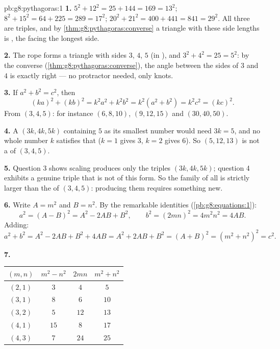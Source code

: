 \begin{solution}{pb:g8:pythagoras:1}
\textbf{1.} $5^2 + 12^2 = 25 + 144 = 169 = 13^2$; \quad
$8^2 + 15^2 = 64 + 225 = 289 = 17^2$; \quad
$20^2 + 21^2 = 400 + 441 = 841 = 29^2$. All three are triples,
and by \cref{thm:g8:pythagoras:converse} a triangle with these
side lengths is , the  facing the longest
side.

\textbf{2.} The rope forms a triangle with sides $3$, $4$, $5$
(in ), and $3^2 + 4^2 = 25 = 5^2$: by the converse
(\cref{thm:g8:pythagoras:converse}), the angle between the sides
of $3$ and $4$  is exactly right --- no protractor
needed, only knots.

\textbf{3.} If $a^2 + b^2 = c^2$, then
\[
(ka)^2 + (kb)^2 = k^2 a^2 + k^2 b^2
= k^2\left(a^2 + b^2\right) = k^2 c^2 = (kc)^2 .
\]
From $(3, 4, 5)$: for instance $(6, 8, 10)$, $(9, 12, 15)$ and
$(30, 40, 50)$.

\textbf{4.} A  $(3k, 4k, 5k)$ containing $5$ as its
smallest number would need $3k = 5$, and no whole number $k$
satisfies that ($k = 1$ gives $3$, $k = 2$ gives $6$). So
$(5, 12, 13)$ is not a  of $(3, 4, 5)$.

\textbf{5.} Question 3 shows scaling produces only the triples
$(3k, 4k, 5k)$; question 4 exhibits a genuine triple that is not
of this form. So the family of all  is
strictly larger than the  of $(3, 4, 5)$: producing them
requires something new.

\textbf{6.} Write $A = m^2$ and $B = n^2$. By the remarkable
identities (\cref{pb:g8:equations:1}):
\[
a^2 = (A - B)^2 = A^2 - 2AB + B^2,
\qquad
b^2 = (2mn)^2 = 4m^2n^2 = 4AB .
\]
Adding:
\[
a^2 + b^2 = A^2 - 2AB + B^2 + 4AB
= A^2 + 2AB + B^2 = (A + B)^2
= \left(m^2 + n^2\right)^2 = c^2 .
\]

\textbf{7.}
\begin{center}
\renewcommand{\arraystretch}{1.2}
\begin{tabular}{c|ccc}
$(m, n)$ & $m^2 - n^2$ & $2mn$ & $m^2 + n^2$ \\
\hline
$(2, 1)$ & $3$ & $4$ & $5$ \\
$(3, 1)$ & $8$ & $6$ & $10$ \\
$(3, 2)$ & $5$ & $12$ & $13$ \\
$(4, 1)$ & $15$ & $8$ & $17$ \\
$(4, 3)$ & $7$ & $24$ & $25$ \\
\end{tabular}
\end{center}


\end{solution}
